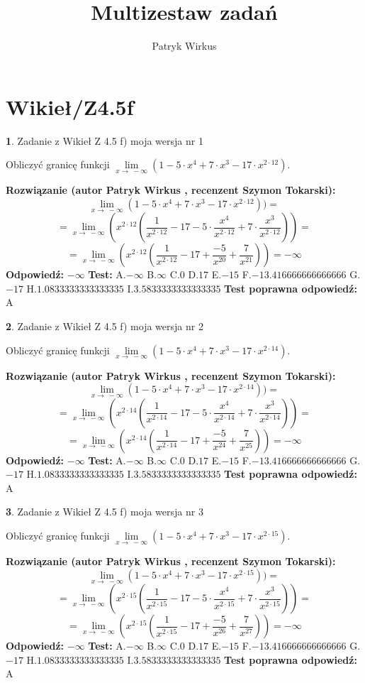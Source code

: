 \documentclass[12pt, a4paper]{article}
\title{Multizestaw zadań}
\author{Patryk Wirkus}
\date{}
\theoremstyle{definition} %
\newtheorem{zad}{}
\newcommand{\kategoria}[1]{\section{#1}}
\newcommand{\zadStart}[1]{\begin{zad}#1\newline}
\newcommand{\zadStop}{\end{zad}}
\newcommand{\rozwStart}[2]{\noindent \textbf{Rozwiązanie (autor #1 , recenzent #2): }\newline}
\newcommand{\rozwStop}{\newline}
\newcommand{\odpStart}{\noindent \textbf{Odpowiedź:}\newline}
\newcommand{\odpStop}{\newline}
\newcommand{\testStart}{\noindent \textbf{Test:}\newline}
\newcommand{\testStop}{\newline}
\newcommand{\kluczStart}{\noindent \textbf{Test poprawna odpowiedź:}\newline}
\newcommand{\kluczStop}{\newline}
\begin{document}
\maketitle

\kategoria{Wikieł/Z4.5f}


\zadStart{Zadanie z Wikieł Z 4.5 f) moja wersja nr 1}


Obliczyć granicę funkcji  $\lim\limits_{x\to\ -\infty}(1 - 5 \cdot x^{4}+7 \cdot x^{3}- 17 \cdot x^{2\cdot12})$.
\zadStop
\rozwStart{Patryk Wirkus}{Szymon Tokarski}
$$\lim\limits_{x\to\ -\infty}(1 - 5 \cdot x^{4}+7 \cdot x^{3}- 17 \cdot x^{2\cdot12}))=$$
$$=\lim\limits_{x\to\ -\infty}(x^{2\cdot12}(\frac{1}{x^{2\cdot12}}-17 -5 \cdot \frac{x^{4}}{x^{2\cdot12}}+7 \cdot \frac{x^{3}}{x^{2\cdot12}}))=$$
$$=\lim\limits_{x\to\ -\infty}(x^{2\cdot12}(\frac{1}{x^{2\cdot12}}-17 + \frac{-5}{x^{20}}+ \frac{7}{x^{21}}))=-\infty$$
\rozwStop
\odpStart
$-\infty$
\odpStop
\testStart
A.$-\infty$ B.$\infty$ C.$0$ D.$17$ E.$-15$
F.$-13.416666666666666$ G.$-17$
H.$1.0833333333333335$
I.$3.5833333333333335$
\testStop
\kluczStart
A
\kluczStop



\zadStart{Zadanie z Wikieł Z 4.5 f) moja wersja nr 2}


Obliczyć granicę funkcji  $\lim\limits_{x\to\ -\infty}(1 - 5 \cdot x^{4}+7 \cdot x^{3}- 17 \cdot x^{2\cdot14})$.
\zadStop
\rozwStart{Patryk Wirkus}{Szymon Tokarski}
$$\lim\limits_{x\to\ -\infty}(1 - 5 \cdot x^{4}+7 \cdot x^{3}- 17 \cdot x^{2\cdot14}))=$$
$$=\lim\limits_{x\to\ -\infty}(x^{2\cdot14}(\frac{1}{x^{2\cdot14}}-17 -5 \cdot \frac{x^{4}}{x^{2\cdot14}}+7 \cdot \frac{x^{3}}{x^{2\cdot14}}))=$$
$$=\lim\limits_{x\to\ -\infty}(x^{2\cdot14}(\frac{1}{x^{2\cdot14}}-17 + \frac{-5}{x^{24}}+ \frac{7}{x^{25}}))=-\infty$$
\rozwStop
\odpStart
$-\infty$
\odpStop
\testStart
A.$-\infty$ B.$\infty$ C.$0$ D.$17$ E.$-15$
F.$-13.416666666666666$ G.$-17$
H.$1.0833333333333335$
I.$3.5833333333333335$
\testStop
\kluczStart
A
\kluczStop



\zadStart{Zadanie z Wikieł Z 4.5 f) moja wersja nr 3}


Obliczyć granicę funkcji  $\lim\limits_{x\to\ -\infty}(1 - 5 \cdot x^{4}+7 \cdot x^{3}- 17 \cdot x^{2\cdot15})$.
\zadStop
\rozwStart{Patryk Wirkus}{Szymon Tokarski}
$$\lim\limits_{x\to\ -\infty}(1 - 5 \cdot x^{4}+7 \cdot x^{3}- 17 \cdot x^{2\cdot15}))=$$
$$=\lim\limits_{x\to\ -\infty}(x^{2\cdot15}(\frac{1}{x^{2\cdot15}}-17 -5 \cdot \frac{x^{4}}{x^{2\cdot15}}+7 \cdot \frac{x^{3}}{x^{2\cdot15}}))=$$
$$=\lim\limits_{x\to\ -\infty}(x^{2\cdot15}(\frac{1}{x^{2\cdot15}}-17 + \frac{-5}{x^{26}}+ \frac{7}{x^{27}}))=-\infty$$
\rozwStop
\odpStart
$-\infty$
\odpStop
\testStart
A.$-\infty$ B.$\infty$ C.$0$ D.$17$ E.$-15$
F.$-13.416666666666666$ G.$-17$
H.$1.0833333333333335$
I.$3.5833333333333335$
\testStop
\kluczStart
A
\kluczStop
\end{document}
